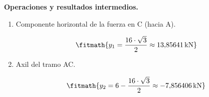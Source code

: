 \noindent\textbf{Operaciones y resultados intermedios.}

\begin{enumerate}

\item Componente horizontal de la fuerza en C (hacia A).

\[\fitmath{y_{1}=\frac{16\cdot \sqrt{3}}{2}\approx 13{,}85641\,\mathrm{kN}}\]

\item Axil del tramo AC.

\[\fitmath{y_{2}=6-\frac{16\cdot \sqrt{3}}{2}\approx -7{,}856406\,\mathrm{kN}}\]

\end{enumerate}
